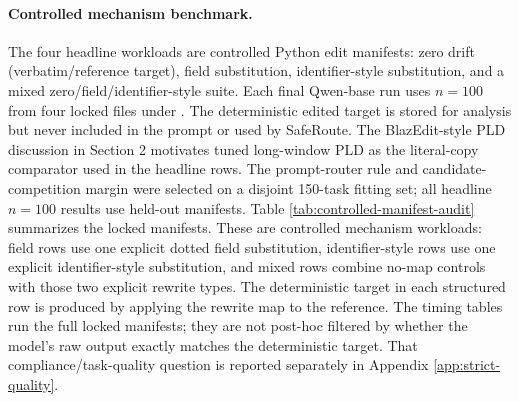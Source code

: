 \documentclass[11pt,a4paper]{article}
\begin{document}
\paragraph{Controlled mechanism benchmark.}
The four headline workloads are controlled Python edit manifests:
zero drift (verbatim/reference target), field substitution, identifier-style substitution, and
a mixed zero/field/identifier-style suite. Each final Qwen-base run uses $n=100$
from four locked files under .
The deterministic edited target is stored for analysis but never
included in the prompt or used by SafeRoute. The BlazEdit-style PLD discussion
in Section 2 motivates tuned long-window PLD as the literal-copy comparator
used in the headline rows.
The prompt-router rule and candidate-competition margin were selected
on a disjoint 150-task fitting set; all headline $n=100$ results use
held-out manifests.
Table \ref{tab:controlled-manifest-audit} summarizes the locked manifests.
These are controlled mechanism workloads: field rows use one explicit dotted
field substitution, identifier-style rows use one explicit identifier-style substitution,
and mixed rows combine no-map controls with those two explicit rewrite types.
The deterministic target in each structured row is produced by applying the
rewrite map to the reference. The timing tables run the full locked manifests;
they are not post-hoc filtered by whether the model's raw output exactly
matches the deterministic target. That compliance/task-quality question is
reported separately in Appendix \ref{app:strict-quality}.

\begin{table}[h]
\centering\scriptsize
\caption{Controlled manifest audit generated from the locked validation
manifests. Prompt-visible maps count rows where an explicit non-empty map is
present in the prompt. These rows define the mechanism benchmark, not a
real-commit benchmark.}
\label{tab:controlled-manifest-audit}
\end{table}
\end{document}
